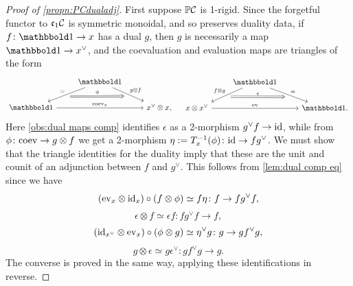 \documentclass[a4paper,11pt]{article}
\begin{document}
\begin{proof}[Proof of \cref{propn:PCdualadj}]
  First suppose $\mathbb{P}\mathcal{C}$ is 1-rigid. Since the forgetful functor to
  $\mathfrak{c}_{1} \mathcal{C}$ is symmetric monoidal, and so preserves duality data, if
  $f \colon \bbone \to x$ has a dual $g$, then $g$ is necessarily a
  map $\bbone \to x^{\vee}$, and the coevaluation and evaluation maps
  are triangles of the form
  \[
    \begin{tikzcd}
      {} & \bbone \ar[dl, "="', ""{name=A}] \ar[dr, "g \otimes f", ""{swap, name=B}] \\
      \bbone \ar[rr, "\coev_{x}"] & & x^{\vee} \otimes x, \ar[from=A, to=B, Rightarrow, "\phi"]
    \end{tikzcd} \quad \begin{tikzcd}
      {} & \bbone \ar[dl, "f \otimes g"', ""{name=A}] \ar[dr, "=", ""{swap, name=B}] \\
      x \otimes x^{\vee} \ar[rr, "\ev"] & & \bbone. \ar[from=A, to=B, Rightarrow, "\epsilon"]
    \end{tikzcd}
  \]
  Here \cref{obs:dual maps comp} identifies $\epsilon$ as a 2-morphism
  $g^{\vee}f \to \id$, while from $\phi \colon \coev \to g \otimes f$
  we get a 2-morphism
  $\eta := T_{x}^{-1}(\phi) \colon \id \to fg^{\vee}$. We must show
  that the triangle identities for the duality imply that these are
  the unit and counit of an adjunction between $f$ and $g^{\vee}$.
  This follows from \cref{lem:dual comp eq} since we have
  \[(\ev_{x} \otimes \id_{x})\circ (f \otimes \phi) \simeq f\eta \colon
    f \to fg^{\vee}f,\]
  \[ \epsilon \otimes f \simeq \epsilon f \colon fg^{\vee}f \to f,\]
\[ (\id_{x^{\vee}} \otimes \ev_{x}) \circ (\phi \otimes g) \simeq
  \eta^{\vee} g \colon g \to gf^{\vee}g,\]
\[ g \otimes \epsilon \simeq g \epsilon^{\vee} \colon gf^{\vee}g \to g.\]
The converse is proved in the same way, applying these identifications
in reverse.
\end{proof}
\end{document}
